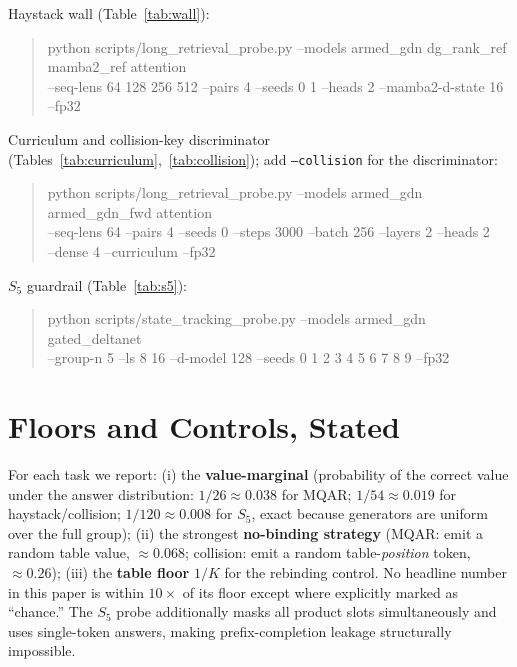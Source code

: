 \documentclass{article}
\begin{document}
Haystack wall (Table~\ref{tab:wall}):
\begin{quote}\small\ttfamily
python scripts/long\_retrieval\_probe.py --models armed\_gdn dg\_rank\_ref mamba2\_ref attention \\
\hspace*{1.5em}--seq-lens 64 128 256 512 --pairs 4 --seeds 0 1 --heads 2 --mamba2-d-state 16 --fp32
\end{quote}

Curriculum and collision-key discriminator (Tables~\ref{tab:curriculum},~\ref{tab:collision}); add \texttt{--collision} for the discriminator:
\begin{quote}\small\ttfamily
python scripts/long\_retrieval\_probe.py --models armed\_gdn armed\_gdn\_fwd attention \\
\hspace*{1.5em}--seq-lens 64 --pairs 4 --seeds 0 --steps 3000 --batch 256 --layers 2 --heads 2 \\
\hspace*{1.5em}--dense 4 --curriculum --fp32
\end{quote}

$S_5$ guardrail (Table~\ref{tab:s5}):
\begin{quote}\small\ttfamily
python scripts/state\_tracking\_probe.py --models armed\_gdn gated\_deltanet \\
\hspace*{1.5em}--group-n 5 --ls 8 16 --d-model 128 --seeds 0 1 2 3 4 5 6 7 8 9 --fp32
\end{quote}

\section{Floors and Controls, Stated}\label{app:floors}

For each task we report: (i) the \textbf{value-marginal} (probability of the correct value under the answer distribution: $1/26\approx0.038$ for MQAR; $1/54\approx0.019$ for haystack/collision; $1/120\approx0.008$ for $S_5$, exact because generators are uniform over the full group); (ii) the strongest \textbf{no-binding strategy} (MQAR: emit a random table value, ${\approx}0.068$; collision: emit a random table-\emph{position} token, ${\approx}0.26$); (iii) the \textbf{table floor} $1/K$ for the rebinding control. No headline number in this paper is within $10\times$ of its floor except where explicitly marked as ``chance.'' The $S_5$ probe additionally masks all product slots simultaneously and uses single-token answers, making prefix-completion leakage structurally impossible.
\end{document}
